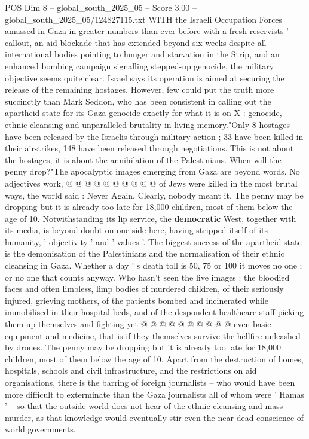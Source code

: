 \begin{textsample}{POS Dim 8 – global\_south\_2025\_05 – Score 3.00 – global\_south\_2025\_05/124827115.txt}  \label{ex:f8_pos_442}
WITH the Israeli Occupation Forces amassed in Gaza in greater numbers than ever before with a fresh reservists ' callout, an aid blockade that has extended beyond six weeks despite all international bodies pointing to hunger and starvation in the Strip, and an enhanced bombing campaign signalling stepped-up genocide, the military objective seems quite clear.
Israel says its operation is aimed at securing the release of the remaining hostages.
However, few could put the truth more succinctly than Mark Seddon, who has been consistent in calling out the apartheid state for its Gaza genocide exactly for what it is on X : genocide, ethnic cleansing and unparalleled brutality in living memory."Only 8 hostages have been released by the Israelis through military action ; 33 have been killed in their airstrikes, 148 have been released through negotiations.
This is not about the hostages, it is about the annihilation of the Palestinians.
When will the penny drop?"The apocalyptic images emerging from Gaza are beyond words.
No adjectives work, @ @ @ @ @ @ @ @ @ @ of Jews were killed in the most brutal ways, the world said : Never Again.
Clearly, nobody meant it.
The penny may be dropping but it is already too late for 18,000 children, most of them below the age of 10.
Notwithstanding its lip service, the \textbf{democratic} West, together with its media, is beyond doubt on one side here, having stripped itself of its humanity, ' objectivity ' and ' values '.
The biggest success of the apartheid state is the demonisation of the Palestinians and the normalisation of their ethnic cleansing in Gaza.
Whether a day ' s death toll is 50, 75 or 100 it moves no one ; or no one that counts anyway.
Who hasn't seen the live images : the bloodied faces and often limbless, limp bodies of murdered children, of their seriously injured, grieving mothers, of the patients bombed and incinerated while immobilised in their hospital beds, and of the despondent healthcare staff picking them up themselves and fighting yet @ @ @ @ @ @ @ @ @ @ even basic equipment and medicine, that is if they themselves survive the hellfire unleashed by drones.
The penny may be dropping but it is already too late for 18,000 children, most of them below the age of 10.
Apart from the destruction of homes, hospitals, schools and civil infrastructure, and the restrictions on aid organisations, there is the barring of foreign journalists -- who would have been more difficult to exterminate than the Gaza journalists all of whom were ' Hamas ' -- so that the outside world does not hear of the ethnic cleansing and mass murder, as that knowledge would eventually stir even the near-dead conscience of world governments.

\end{textsample}
